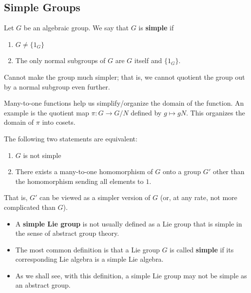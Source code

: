 \subsection{Simple Groups}

\begin{definition}
   Let \( G  \) be an algebraic group. We say that \( G  \) is \textbf{simple} if  
   \begin{enumerate}
       \item[(1)] \( G \neq \{  {1}_{G} \}  \)
       \item[(2)] The only normal subgroups of \( G  \) are \( G  \) itself and \( \{  {1}_{G} \}  \).
   \end{enumerate}
\end{definition}

Cannot make the group much simpler; that is, we cannot quotient the group out by a normal subgroup even further.

\begin{remark}[Observation]
    Many-to-one functions help us simplify/organize the domain of the function. An example is the quotient map \( \pi : G \to G / N  \) defined by \( g \mapsto g N  \). This organizes the domain of \( \pi  \) into cosets.  
\end{remark}

\begin{remark}
    The following two statements are equivalent:
    \begin{enumerate}
        \item[(1)] \( G  \) is not simple 
        \item[(2)] There exists a many-to-one homomorphism of \( G  \) onto a group \( G' \) other than the homomorphism sending all elements to \( 1  \).
    \end{enumerate}
    That is, \( G'  \) can be viewed as a simpler version of \( G  \) (or, at any rate, not more complicated than \( G  \)).
\end{remark}

\begin{remark}
    \begin{itemize}
        \item A \textbf{simple Lie group} is not usually defined as a Lie group that is simple in the sense of abstract group theory.
        \item The most common definition is that a Lie group \( G  \) is called \textbf{simple} if its corresponding Lie algebra is a simple Lie algebra.
        \item As we shall see, with this definition, a simple Lie group may not be simple as an abstract group.
    \end{itemize}
\end{remark}

